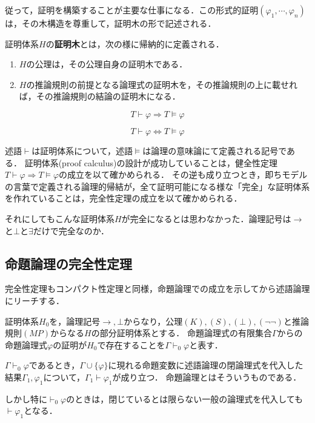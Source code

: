 \documentclass[uplatex, dvipdfmx]{jsreport}
\begin{document}
従って，証明を構築することが主要な仕事になる．この形式的証明$(\varphi_1,\cdots,\varphi_n)$は，その木構造を尊重して，証明木の形で記述される．
\begin{definition}
    証明体系$H$の\textbf{証明木}とは，次の様に帰納的に定義される．
    \begin{enumerate}
        \item $H$の公理は，その公理自身の証明木である．
        \item $H$の推論規則の前提となる論理式の証明木を，その推論規則の上に載せれば，その推論規則の結論の証明木になる．
    \end{enumerate}
\end{definition}

\begin{theorem}
    \[ T\vdash\varphi\Rightarrow T\vDash\varphi \]
\end{theorem}

\begin{theorem}
    \[ T\vdash\varphi\Leftrightarrow T\vDash\varphi \]
\end{theorem}

\begin{itembox}
    述語$\vdash$は証明体系について，述語$\vDash$は論理の意味論にて定義される記号である．
    証明体系(proof calculus)の設計が成功していることは，健全性定理$T\vdash\varphi\Rightarrow T\vDash\varphi$の成立を以て確かめられる．
    その逆も成り立つとき，即ちモデルの言葉で定義される論理的帰結が，全て証明可能になる様な「完全」な証明体系を作れていることは，完全性定理の成立を以て確かめられる．

    それにしてもこんな証明体系$H$が完全になるとは思わなかった．論理記号は$\to$と$\bot$と$\exists$だけで完全なのか．
\end{itembox}

\subsection{命題論理の完全性定理}
完全性定理もコンパクト性定理と同様，命題論理での成立を示してから述語論理にリーチする．

\begin{definition}[証明体系Hの命題論理部分]
    証明体系$H_0$を，論理記号$\to,\bot$からなり，公理$(K),(S),(\bot),(\lnot\lnot)$と推論規則$(MP)$からなる$H$の部分証明体系とする．
    命題論理式の有限集合$\Gamma$からの命題論理式$\varphi$の証明が$H_0$で存在することを$\Gamma\vdash_0\varphi$と表す．
\end{definition}
\begin{remark}
    $\Gamma\vdash_0\varphi$であるとき，$\Gamma\cup\{\varphi\}$に現れる命題変数に述語論理の閉論理式を代入した結果$\Gamma_1,\varphi_1$について，$\Gamma_1\vdash\varphi_1$が成り立つ．
    命題論理とはそういうものである．

    しかし特に$\vdash_0\varphi$のときは，閉じているとは限らない一般の論理式を代入しても$\vdash\varphi_1$となる．
\end{remark}
\end{document}
